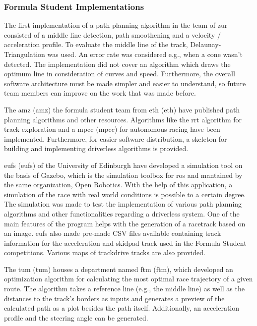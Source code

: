 \subsubsection{Formula Student Implementations} \label{sec:Formula Student Implementations}
The first implementation of a path planning algorithm in the team of \acrlong{zur} consisted of a middle line detection, path smoothening and a velocity / acceleration profile. To evaluate the middle line of the track, Delaunay-Triangulation was used. An error rate was considered e.g., when a cone wasn't detected. The implementation did not cover an algorithm which draws the optimum line in consideration of curves and speed. Furthermore, the overall software architecture must be made simpler and easier to understand, so future team members can improve on the work that was made before.
\cite{autopilot_for_formula_student_jerome}

The \acrshort{amz} (\acrlong{amz}) the formula student team from \acrshort{eth} (\acrlong{eth}) have published path planning algorithms and other resources. Algorithms like the \acrshort{rrt} algorithm for track exploration and a \acrlong{mpcc} (\acrshort{mpcc}) for autonomous racing have been implemented. Furthermore, for easier software distribution, a skeleton for building and implementing driverless algorithms is provided.
\cite{amz_racing_github}

\acrlong{eufs} (\acrshort{eufs}) of the University of Edinburgh have developed a simulation tool on the basis of Gazebo, which is the simulation toolbox for \acrshort{ros} and mantained by the same organization, Open Robotics. With the help of this application, a simulation of the race with real world conditions is possible to a certain degree. The simulation was made to test the implementation of various path planning algorithms and other functionalities regarding a driverless system. One of the main features of the program helps with the generation of a racetrack based on an image. \acrshort{eufs} also made pre-made CSV files available containing track information for the acceleration and skidpad track used in the Formula Student competitions. Various maps of trackdrive tracks are also provided.
\cite{eufs_sim_gitlab}

The \acrlong{tum} (\acrshort{tum}) houses a department named \acrlong{ftm} (\acrshort{ftm}), which developed an optimization algorithm for calculating the most optimal race trajectory of a given route. The algorithm takes a reference line (e.g., the middle line) as well as the distances to the track's borders as inputs and generates a preview of the calculated path as a plot besides the path itself. Additionally, an acceleration profile and the steering angle can be generated.
\cite{tumftm_optimization_algoritm}

